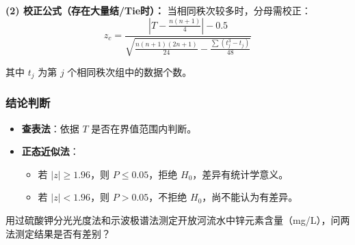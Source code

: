 \documentclass[lang=cn,10pt]{elegantbook}
\begin{document}
\textbf{(2) 校正公式（存在大量结/Tie时）：}
当相同秩次较多时，分母需校正：
\[
z_c = \frac{\left|T-\frac{n(n+1)}{4}\right|-0.5}{\sqrt{\frac{n(n+1)(2n+1)}{24}-\frac{\sum\left(t_j^3-t_j\right)}{48}}}
\]

其中 $t_j$ 为第 $j$ 个相同秩次组中的数据个数。

\subsubsection{结论判断}
\begin{itemize}
    \item \textbf{查表法}：依据 $T$ 是否在界值范围内判断。
    \item \textbf{正态近似法}：
    \begin{itemize}
        \item 若 $|z| \ge 1.96$，则 $P \le 0.05$，拒绝 $H_0$，差异有统计学意义。
        \item 若 $|z| < 1.96$，则 $P > 0.05$，不拒绝 $H_0$，尚不能认为有差异。
    \end{itemize}
\end{itemize}

\vspace{0.2cm}
\begin{exercise}
用过硫酸钾分光光度法和示波极谱法测定开放河流水中锌元素含量（mg/L），问两法测定结果是否有差别？
\end{exercise}
\end{document}
